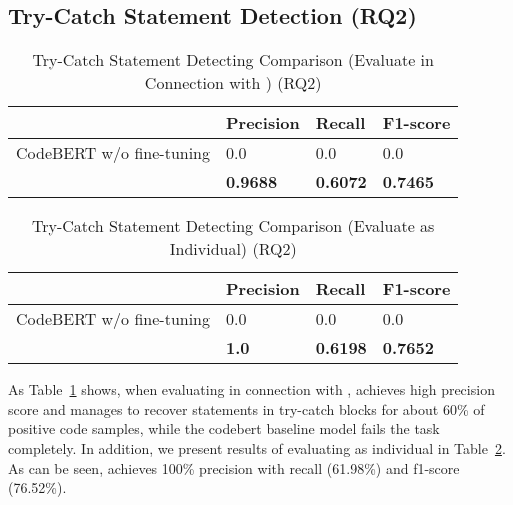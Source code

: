 \subsection{Try-Catch Statement Detection (RQ2)}
\label{sec:rq2}

\begin{table}[t]%
\caption{Try-Catch Statement Detecting Comparison (Evaluate {\xstate} in Connection with {\xblock}) (RQ2)}
  \vspace{-12pt}
  \small
	\begin{center}
		\renewcommand{\arraystretch}{1}
		\begin{tabular}{| p{3.05cm}<{\centering} | p{1.2cm}<{\centering} | p{1.2cm}<{\centering}| p{1.2cm}<{\centering}|}
		  \hline
			  & Precision  & Recall & F1-score \\
			\hline
			CodeBERT w/o fine-tuning &  0.0 & 0.0  & 0.0\\
			\hline
			\tool   & \textbf{0.9688}  &  \textbf{0.6072} & \textbf{0.7465}\\
			\hline
		\end{tabular}
		\label{tab:xstate-1}
	\end{center}
\end{table}

\begin{table}[t]%
\caption{Try-Catch Statement Detecting Comparison (Evaluate {\xstate} as Individual) (RQ2)}
  \vspace{-12pt}
  \small
	\begin{center}
		\renewcommand{\arraystretch}{1}
		\begin{tabular}{| p{3.05cm}<{\centering} | p{1.2cm}<{\centering} | p{1.2cm}<{\centering}| p{1.2cm}<{\centering}|}
		  \hline
			  & Precision  & Recall & F1-score \\
			\hline
			CodeBERT w/o fine-tuning &  0.0 & 0.0  & 0.0\\
			\hline
			\tool   & \textbf{1.0}  &  \textbf{0.6198} & \textbf{0.7652}\\
			\hline
		\end{tabular}
		\label{tab:xstate-2}
	\end{center}
\end{table}

As Table~\ref{tab:xstate-1} shows, when evaluating {\xstate} in connection with {\xblock}, 
{\tool} achieves high precision score and manages to recover statements in try-catch blocks for about 60\% of positive code samples, 
while the codebert baseline model fails the task completely.
In addition, we present results of evaluating {\xstate} as individual in Table~\ref{tab:xstate-2}. As can be seen, {\tool} achieves 100\% precision with recall (61.98\%)
and f1-score (76.52\%).

